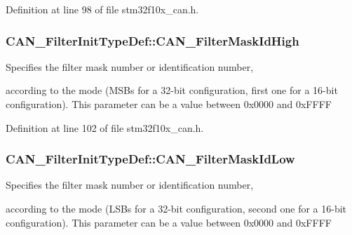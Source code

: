 Definition at line 98 of file stm32f10x\-\_\-can.\-h.

\hypertarget{struct_c_a_n___filter_init_type_def_a6f34539615e6484f266b46aa8f362a91}{
\subsubsection[{C\-A\-N\-\_\-\-Filter\-Mask\-Id\-High}]{ C\-A\-N\-\_\-\-Filter\-Init\-Type\-Def\-::\-C\-A\-N\-\_\-\-Filter\-Mask\-Id\-High}}\label{struct_c_a_n___filter_init_type_def_a6f34539615e6484f266b46aa8f362a91}
\begin{DoxyVerb}         Specifies the filter mask number or identification number,
\end{DoxyVerb}
 according to the mode (M\-S\-Bs for a 32-\/bit configuration, first one for a 16-\/bit configuration). This parameter can be a value between 0x0000 and 0x\-F\-F\-F\-F 

Definition at line 102 of file stm32f10x\-\_\-can.\-h.

\hypertarget{struct_c_a_n___filter_init_type_def_a0f052daf04b0a481ecfa5c2cc8058089}{
\subsubsection[{C\-A\-N\-\_\-\-Filter\-Mask\-Id\-Low}]{ C\-A\-N\-\_\-\-Filter\-Init\-Type\-Def\-::\-C\-A\-N\-\_\-\-Filter\-Mask\-Id\-Low}}\label{struct_c_a_n___filter_init_type_def_a0f052daf04b0a481ecfa5c2cc8058089}
\begin{DoxyVerb}          Specifies the filter mask number or identification number,
\end{DoxyVerb}
 according to the mode (L\-S\-Bs for a 32-\/bit configuration, second one for a 16-\/bit configuration). This parameter can be a value between 0x0000 and 0x\-F\-F\-F\-F 


